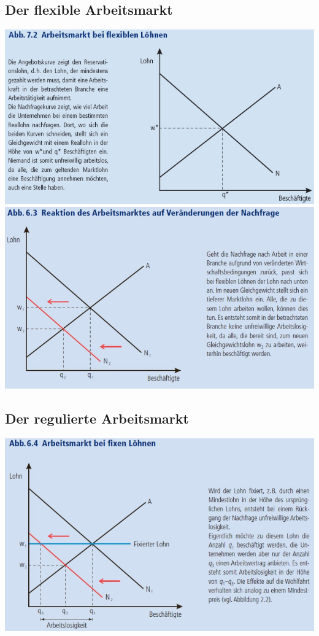 \subsection{Der flexible Arbeitsmarkt}
\begin{multicols}{2}
	\includegraphics[width=0.95\linewidth]{images/flexibellohne.jpg}
	\includegraphics[width=0.95\linewidth]{images/flexibellohne2.jpg}
\end{multicols}
\subsection{Der regulierte Arbeitsmarkt}
	\includegraphics[width=0.8\linewidth]{images/fixelohne.jpg}

